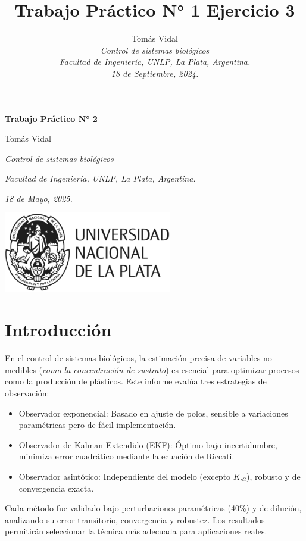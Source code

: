 \documentclass[letterpaper, 10 pt, conference]{ieeeconf}  %
\title{\LARGE \bf Trabajo Práctico N° 1 Ejercicio 3}
\author{
  Tom\'as Vidal\\
  {\it Control de sistemas biológicos}\\
  {\it Facultad de Ingenier\'ia, UNLP, La Plata, Argentina.}\\
  {\it 18 de Septiembre, 2024.}
}                                            %
\begin{document}
\begin{titlepage}
	\centering
	\null\vspace{4cm} %
	{\LARGE \textbf{Trabajo Práctico N° 2} \par}
	\vspace{2cm}
	{\large Tomás Vidal \par}
	{\itshape Control de sistemas biológicos \par}
	{\itshape Facultad de Ingeniería, UNLP, La Plata, Argentina. \par}
	{\itshape 18 de Mayo, 2025. \par}
	\vspace{2cm}
	\includegraphics[width=0.55\textwidth]{unlp_logo.png}
	\vfill %
\end{titlepage}

\section{Introducción}

En el control de sistemas biológicos, la estimación precisa de variables no medibles (\textit{como la concentración de sustrato}) es esencial para optimizar procesos como la producción de plásticos. Este informe evalúa tres estrategias de observación:

\begin{itemize}
  \item{Observador exponencial: Basado en ajuste de polos, sensible a variaciones paramétricas pero de fácil implementación.}
  \item{Observador de Kalman Extendido (EKF): Óptimo bajo incertidumbre, minimiza error cuadrático mediante la ecuación de Riccati.}
  \item{Observador asintótico: Independiente del modelo (excepto $K_{s2}$), robusto y de convergencia exacta.}
\end{itemize}

Cada método fue validado bajo perturbaciones paramétricas (40\%) y de dilución, analizando su error transitorio, convergencia y robustez. Los resultados permitirán seleccionar la técnica más adecuada para aplicaciones reales.
\end{document}
